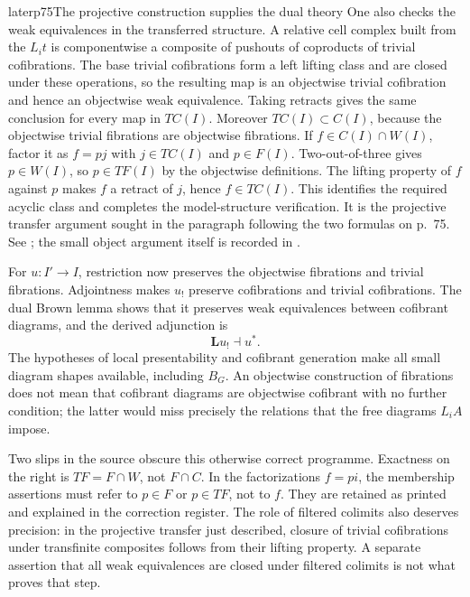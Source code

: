 \begin{dcomment}{later}{p75}{The projective construction supplies the dual theory}
One also checks the weak equivalences in the transferred structure. A relative cell complex built from the $L_it$ is componentwise a composite of pushouts of coproducts of trivial cofibrations. The base trivial cofibrations form a left lifting class and are closed under these operations, so the resulting map is an objectwise trivial cofibration and hence an objectwise weak equivalence. Taking retracts gives the same conclusion for every map in $TC(I)$. Moreover $TC(I)\subset C(I)$, because the objectwise trivial fibrations are objectwise fibrations. If $f\in C(I)\cap W(I)$, factor it as $f=pj$ with $j\in TC(I)$ and $p\in F(I)$. Two-out-of-three gives $p\in W(I)$, so $p\in TF(I)$ by the objectwise definitions. The lifting property of $f$ against $p$ makes $f$ a retract of $j$, hence $f\in TC(I)$. This identifies the required acyclic class and completes the model-structure verification. It is the projective transfer argument sought in the paragraph following the two formulas on p.~75. See \citet[Theorem 1.28 and Lemma 1.29]{Groth2013}; the small object argument itself is recorded in \citet[Theorem 2.1.14]{Hovey1999}.

For $u:I'\to I$, restriction now preserves the objectwise fibrations and trivial fibrations. Adjointness makes $u_!$ preserve cofibrations and trivial cofibrations. The dual Brown lemma shows that it preserves weak equivalences between cofibrant diagrams, and the derived adjunction is
\[
                              \mathbf Lu_!\dashv u^*.
\]
The hypotheses of local presentability and cofibrant generation make all small diagram shapes available, including $B_G$. An objectwise construction of fibrations does not mean that cofibrant diagrams are objectwise cofibrant with no further condition; the latter would miss precisely the relations that the free diagrams $L_iA$ impose.

Two slips in the source obscure this otherwise correct programme. Exactness on the right is $TF=F\cap W$, not $F\cap C$. In the factorizations $f=pi$, the membership assertions must refer to $p\in F$ or $p\in TF$, not to $f$. They are retained as printed and explained in the correction register. The role of filtered colimits also deserves precision: in the projective transfer just described, closure of trivial cofibrations under transfinite composites follows from their lifting property. A separate assertion that all weak equivalences are closed under filtered colimits is not what proves that step.
\end{dcomment}

